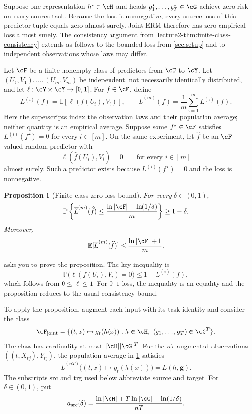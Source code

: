 \documentclass[11pt,twoside]{article}
\newcommand{\E}{\mathbb E}
\renewcommand{\P}{\mathbb P}
\newtheorem{proposition}[theorem]{Proposition}
\theoremstyle{definition}
\theoremstyle{remark}
\begin{document}
Suppose one representation $h^\star\in\cH$ and heads
$g_1^\star,\ldots,g_T^\star\in\cG$ achieve zero risk on every source task.
Because the loss is nonnegative, every source loss of this predictor tuple
equals zero almost surely. Joint ERM therefore has zero empirical loss almost
surely. The consistency argument from
\cref{lecture2-thm:finite-class-consistency} extends as follows to the bounded
loss from \cref{sec:setup} and to independent observations whose laws may
differ.

Let $\cF$ be a finite nonempty class of predictors from $\cU$ to $\cY$.
Let $(U_1,V_1),\ldots,(U_m,V_m)$ be independent, not necessarily identically
distributed, and let $\ell:\cY\times\cY\to[0,1]$. For $f\in\cF$, define
\[
 L^{(i)}(f)=\E[\ell(f(U_i),V_i)],
 \qquad
 \overline L^{(m)}(f)=\frac1m\sum_{i=1}^m L^{(i)}(f).
\]
Here the superscripts index the observation laws and their population
average; neither quantity is an empirical average.
Suppose some $f^\star\in\cF$ satisfies $L^{(i)}(f^\star)=0$ for every $i\in[m]$.
On the same experiment, let $\widehat f$ be an $\cF$-valued random predictor
with
\[
 \ell(\widehat f(U_i),V_i)=0
 \qquad\text{for every }i\in[m]
\]
almost surely. Such a predictor exists because $L^{(i)}(f^\star)=0$ and the loss
is nonnegative.

\begin{proposition}[Finite-class zero-loss bound]
\label{prop:independent-finite-class-consistency}
For every $\delta\in(0,1)$,
\[
 \P\left\{
 \overline L^{(m)}(\widehat f)
 \le \frac{\ln|\cF|+\ln(1/\delta)}{m}
 \right\}\ge1-\delta.
\]
Moreover,
\[
 \E[\overline L^{(m)}(\widehat f)]
 \le \frac{\ln|\cF|+1}{m}.
\]
\end{proposition}

 asks you to prove the proposition. The
key inequality is
\[
 \P\bigl(\ell(f(U_i),V_i)=0\bigr)\le 1-L^{(i)}(f),
\]
which follows from $0\le\ell\le1$. For $0$--$1$ loss, the inequality is an
equality and the proposition reduces to the usual consistency bound.

To apply the proposition, augment each input with its task identity and
consider the class
\[
 \cF_{\rm joint}
 =\{(t,x)\mapsto g_t(h(x)):
       h\in\cH,\ (g_1,\ldots,g_T)\in\cG^T\}.
\]
The class has cardinality at most $|\cH||\cG|^T$. For the $nT$ augmented
observations $((t,X_{tj}),Y_{tj})$, the population average in
\cref{prop:independent-finite-class-consistency} satisfies
\[
 \overline L^{(nT)}\bigl((t,x)\mapsto g_t(h(x))\bigr)
 =\overline L(h,\boldsymbol g).
\]
The subscripts $\mathrm{src}$ and $\mathrm{trg}$ used below abbreviate source
and target.
For $\delta\in(0,1)$, put
\[
 a_{\rm src}(\delta)
 =\frac{\ln|\cH|+T\ln|\cG|+\ln(1/\delta)}{nT}.
\]
\end{document}
